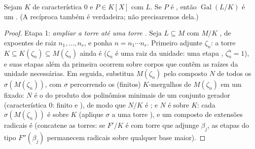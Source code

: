 \begin{theorem}[Galois]\label{thm:b3:galois:solvable}
Sejam $K$ de característica $0$ e $P \in K[X]$ com  $L$. Se $P$ é , então $\operatorname{Gal}(L/K)$ é
um . (A recíproca também é verdadeira; não precisaremos
dela.)
\end{theorem}

\begin{proof}
Etapa 1: \emph{ampliar a torre  até uma torre .} Seja
$L
\subseteq M$ com $M/K$ , de expoentes de raiz $n_1, \dots,
n_r$, e ponha $n = n_1\cdots n_r$.
Primeiro adjunte $\zeta_n$: a torre $K \subseteq K(\zeta_n) \subseteq M(\zeta_n)$ ainda é  ($\zeta_n$ é uma raiz
da unidade: uma etapa , $\zeta_n^n = 1$), e suas etapas além da primeira
ocorrem sobre corpos que contêm as raízes da unidade necessárias. Em
seguida, substitua $M(\zeta_n)$ pelo composto $N$ de todos os $\sigma(M(\zeta_n))$, com
$\sigma$ percorrendo os (finitos) $K$-mergulhos de $M(\zeta_n)$ em um
 fixado: $N$ é o  do produto
dos polinômios minimais de um conjunto gerador (característica
$0$: finito e ), de modo que $N/K$ é ; e
$N$ é  sobre $K$: cada $\sigma(M(\zeta_n))$ é  sobre $K$
(aplique $\sigma$ a uma torre ), e um composto de extensões
radicais é  (concatene as torres: se $F'/K$ é  com
torre que adjunge $\beta_j$, as etapas do tipo $F''(\beta_j)$ permanecem radicais
sobre qualquer base maior).


\end{proof}
